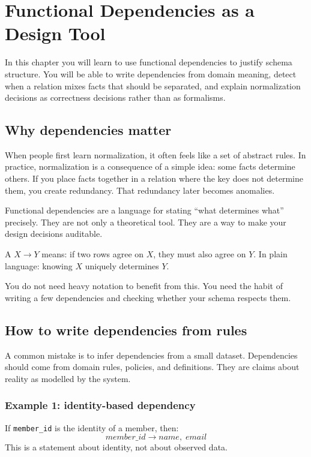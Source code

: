 \chapter{Functional Dependencies as a Design Tool}

\begin{learningobjectives}
In this chapter you will learn to use functional dependencies to justify schema structure.
You will be able to write dependencies from domain meaning, detect when a relation mixes facts that should be separated, and explain normalization decisions as correctness decisions rather than as formalisms.
\end{learningobjectives}

\section{Why dependencies matter}
When people first learn normalization, it often feels like a set of abstract rules.
In practice, normalization is a consequence of a simple idea: some facts determine others.
If you place facts together in a relation where the key does not determine them, you create redundancy.
That redundancy later becomes anomalies.

Functional dependencies are a language for stating “what determines what” precisely.
They are not only a theoretical tool.
They are a way to make your design decisions auditable.

\begin{definitionbox}
A  \(X \rightarrow Y\) means:
if two rows agree on \(X\), they must also agree on \(Y\).
In plain language: knowing \(X\) uniquely determines \(Y\).
\end{definitionbox}

You do not need heavy notation to benefit from this.
You need the habit of writing a few dependencies and checking whether your schema respects them.

\section{How to write dependencies from rules}
A common mistake is to infer dependencies from a small dataset.
Dependencies should come from domain rules, policies, and definitions.
They are claims about reality as modelled by the system.

\subsection{Example 1: identity-based dependency}
If \texttt{member\_id} is the identity of a member, then:
\[
member\_id \rightarrow name,\; email
\]
This is a statement about identity, not about observed data.

